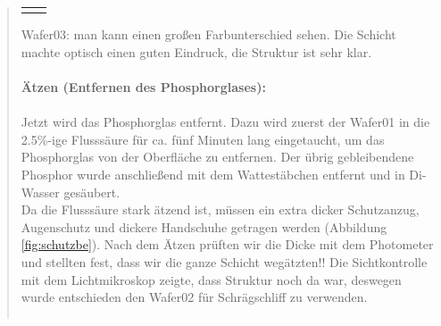 \begin{quote}
\begin{center}
\begin{tabular}{ll}
\begin{minipage}{0.4\textwidth}
                    \end{minipage}

                \end{tabular}
			\end{center}

    		\vspace{2em}

			Wafer03: man kann einen großen Farbunterschied sehen. Die Schicht
			machte optisch einen guten Eindruck, die Struktur ist sehr klar.\\
			\\
			\textbf{Ätzen (Entfernen des Phosphorglases):}\\
			\\
			Jetzt wird das Phosphorglas entfernt. Dazu wird zuerst der Wafer01
			in die 2.5\%-ige Flusssäure für ca. fünf Minuten lang eingetaucht,
			um das Phosphorglas von der Oberfläche zu entfernen. Der übrig
			gebleibendene Phosphor wurde anschließend mit dem Wattestäbchen
			entfernt und in Di-Wasser gesäubert.\\
			Da die Flusssäure stark ätzend ist, müssen ein extra dicker
			Schutzanzug, Augenschutz und dickere Handschuhe getragen werden
			(Abbildung \ref{fig:schutzbe}). Nach dem Ätzen prüften wir die Dicke
			mit dem Photometer und stellten fest, dass wir die ganze Schicht
			wegätzten!! Die Sichtkontrolle mit dem Lichtmikroskop zeigte, dass
			Struktur noch da war, deswegen wurde entschieden den Wafer02 für
			Schrägschliff zu verwenden.

 			\vspace{2em}

    		\begin{center}
                \begin{tabular}{ll}


\end{tabular}
\end{center}
\end{quote}

